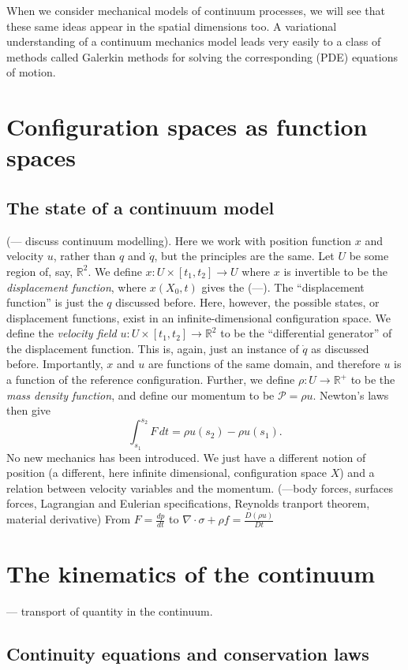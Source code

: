 \documentclass[11pt,a4paper]{memoir}
\newcommand{\fancyP}{\mathcal{P}}
\begin{document}
When we consider mechanical models of continuum processes, we will see that these same ideas appear in the spatial dimensions too.
A variational understanding of a continuum mechanics model leads very easily to a class of methods called Galerkin methods for solving
the corresponding (PDE) equations of motion.


\section{Configuration spaces as function spaces} %
\subsection{The state of a continuum model}
(--- discuss continuum modelling).
Here we work with position function $x$ and velocity $u$, rather than $q$ and $\dot{q}$, but the principles are the same.
Let $U$ be some region of, say, $\mathbb{R}^2$.
We define $x : U\times [t_1, t_2] \rightarrow U$ where $x$ is invertible to be the \textit{displacement function},
where $x(X_0, t)$ gives the (---).
The ``displacement function'' is just the $q$ discussed before. Here, however, the possible states, or displacement functions,
exist in an infinite-dimensional configuration space. We define the \textit{velocity field} $u: U \times [t_1, t_2] \rightarrow \mathbb{R}^2$
to be the ``differential generator'' of the displacement function. This is, again, just an instance of $\dot{q}$ as discussed before.
Importantly, $x$ and $u$ are functions of the same domain, and therefore $u$ is a function of the reference configuration.
Further, we define $\rho : U \rightarrow \mathbb{R}^{+}$ to be the \textit{mass density function}, and define our momentum to be
$\fancyP = \rho u$.
Newton's laws then give
    $$\int_{s_1}^{s_2} F\,dt = \rho u(s_2) - \rho u(s_1).$$
No new mechanics has been introduced. We just have a different notion of position (a different, here infinite dimensional, configuration space $X$)
and a relation between velocity variables and the momentum.
(---body forces, surfaces forces, Lagrangian and Eulerian specifications, Reynolds tranport theorem, material derivative)
From $F = \frac{dp}{dt}$ to $\nabla\cdot\sigma + \rho f = \frac{D(\rho u)}{Dt}$
\section{The kinematics of the continuum} %
--- transport of quantity in the continuum.
\subsection{Continuity equations and conservation laws}
\end{document}
